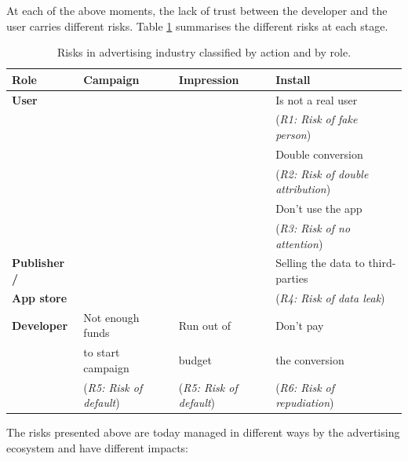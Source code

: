 
At each of the above moments, the lack of trust between the developer and the user carries different risks. Table \ref{tab:risks} summarises the different risks at each stage.


\begin{table}[ht]
\centering
\begin{tabular}{|l||l|l|l|} \hline
{\bf Role} & {\bf Campaign} & {\bf Impression}  & {\bf Install} \\ \hline
{\bf User} & & & Is not a real user \\ 
 & & & ({\em R1: Risk of fake person}) \\ 
 & & & Double conversion  \\
 & & & ({\em R2: Risk of double attribution}) \\
 & & & Don't use the app  \\
 & & & ({\em R3: Risk of no attention}) \\  \hline
{\bf Publisher  /}  & & & Selling the data to third-parties \\ 
{\bf App store} & & & ({\em R4: Risk of data leak})\\ \hline
{\bf Developer} & Not enough funds & Run out of & Don't pay \\  
 & to start campaign & budget & the conversion \\  
  & ({\em R5: Risk of default}) & ({\em R5: Risk of default}) & ({\em R6: Risk of repudiation}) \\  
\hline\end{tabular}
\caption{Risks in advertising industry classified by action and by role.}
\label{tab:risks}
\end{table}

The risks presented above are today managed in different ways by the advertising ecosystem and have different impacts:

